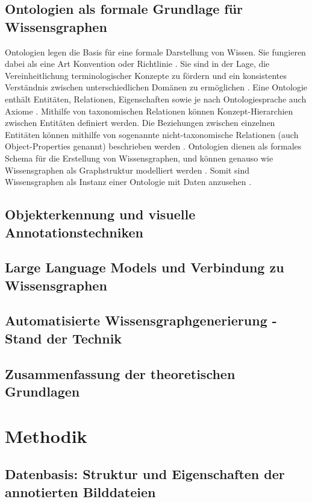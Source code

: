 \documentclass[]{stthesis}
\begin{document}
       
       \section{Ontologien als formale Grundlage für Wissensgraphen}
       Ontologien legen die Basis für eine formale Darstellung von Wissen. Sie fungieren dabei als eine Art Konvention oder Richtlinie \cite{Hogan2021}. Sie sind in der Lage, die Vereinheitlichung terminologischer Konzepte zu fördern und ein konsistentes Verständnis zwischen unterschiedlichen Domänen zu ermöglichen \cite{Yang2021}. Eine Ontologie enthält Entitäten, Relationen, Eigenschaften sowie je nach Ontologiesprache auch Axiome \cite{Hogan2021, Yang2021}. Mithilfe von taxonomischen Relationen können Konzept-Hierarchien zwischen Entitäten definiert werden. Die Beziehungen zwischen einzelnen Entitäten können mithilfe von sogenannte nicht-taxonomische Relationen (auch Object-Properties genannt) beschrieben werden \cite{Yang2021}. Ontologien dienen als formales Schema für die Erstellung von Wissensgraphen, und können genauso wie Wissensgraphen als Graphstruktur modelliert werden \cite{Hogan2021, Peng2023}. Somit sind Wissensgraphen als Instanz einer Ontologie mit Daten anzusehen \cite{ZinkeWehlmann2024}. 

       \section{Objekterkennung und visuelle Annotationstechniken}

       \section{Large Language Models und Verbindung zu Wissensgraphen}

       \section{Automatisierte Wissensgraphgenerierung - Stand der Technik}

       \section{Zusammenfassung der theoretischen Grundlagen}

    \chapter{Methodik}
        \section{Datenbasis: Struktur und Eigenschaften der annotierten Bilddateien}
\end{document}
